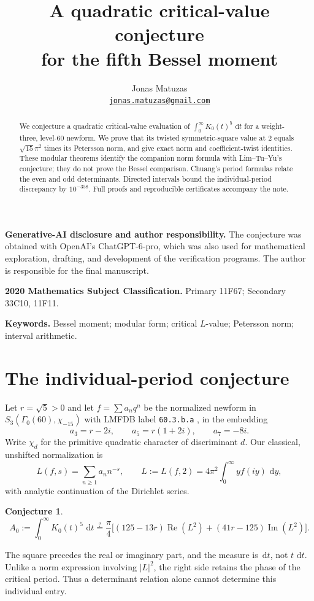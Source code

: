 \documentclass[11pt]{article}
\title{A quadratic critical-value conjecture\\for the fifth Bessel moment}
\author{Jonas Matuzas\\
\href{mailto:jonas.matuzas@gmail.com}{\nolinkurl{jonas.matuzas@gmail.com}}}
\date{}
\numberwithin{equation}{section}
\theoremstyle{definition}
\theoremstyle{remark}
\newcommand{\dd}{\,\mathrm d}
\theoremstyle{plain}
\newtheorem{conjecture}[theorem]{Conjecture}
\newcommand{\Real}{\operatorname{Re}}
\newcommand{\Imag}{\operatorname{Im}}
\begin{document}
\maketitle
\begin{abstract}
We conjecture a quadratic critical-value evaluation of
$\int_0^\infty K_0(t)^5\,\dd t$ for a weight-three, level-60 newform.
We prove that its twisted symmetric-square value at $2$ equals
$\sqrt{15}\pi^2$ times its Petersson norm, and give exact norm and
coefficient-twist identities. These modular theorems identify the companion
norm formula with Lim--Tu--Yu's conjecture; they do not prove the Bessel
comparison. Chuang's period formulas relate the even and odd determinants.
Directed intervals bound the individual-period discrepancy by $10^{-358}$.
Full proofs and reproducible certificates accompany the note.
\end{abstract}

\noindent\textbf{Generative-AI disclosure and author responsibility.}
The conjecture was obtained with OpenAI's ChatGPT-6-pro, which was also used
for mathematical exploration, drafting, and development of the verification
programs. The author is responsible for the final manuscript.

\medskip
\noindent\textbf{2020 Mathematics Subject Classification.}
Primary 11F67; Secondary 33C10, 11F11.

\medskip
\noindent\textbf{Keywords.}
Bessel moment; modular form; critical $L$-value; Petersson norm; interval arithmetic.

\section{The individual-period conjecture}
Let $r=\sqrt5>0$ and let $f=\sum a_nq^n$ be the normalized newform in
$S_3(\Gamma_0(60),\chi_{-15})$ with LMFDB label \texttt{60.3.b.a}
\cite{LMFDB}, in the embedding
\[
 a_3=r-2i,\qquad a_5=r(1+2i),\qquad a_7=-8i.
\]
Write $\chi_d$ for the primitive quadratic character of discriminant $d$.
Our classical, unshifted normalization is
\begin{equation}\label{eq:L}
 L(f,s)=\sum_{n\ge1}a_nn^{-s},\qquad
 L:=L(f,2)=4\pi^2\int_0^\infty y f(iy)\,\dd y,
\end{equation}
with analytic continuation of the Dirichlet series.
\begin{conjecture}\label{conj:main}
\begin{equation}\label{eq:main}
 \boxed{A_0:=\int_0^\infty K_0(t)^5\,\dd t
 \stackrel?=\frac\pi4\big[(125-13r)\Real(L^2)+(41r-125)\Imag(L^2)\big].}
\end{equation}
\end{conjecture}
The square precedes the real or imaginary part, and the measure is $\dd t$,
not $t\,\dd t$. Unlike a norm expression involving $|L|^2$, the right side
retains the phase of the critical period. Thus a determinant relation alone
cannot determine this individual entry.
\end{document}
